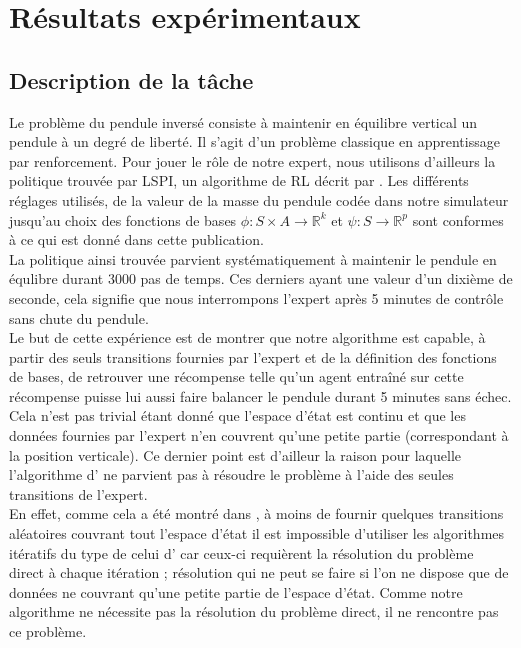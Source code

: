 \documentclass[publibook-draft]{CAp2012}
\begin{document}
\section{Résultats expérimentaux}
\label{exp.sec}
\subsection{Description de la tâche}
Le problème du pendule inversé consiste à maintenir en équilibre vertical un pendule à un degré de liberté. Il s'agit d'un problème classique en apprentissage par renforcement. Pour jouer le rôle de notre expert, nous utilisons d'ailleurs la politique trouvée par LSPI, un algorithme de RL décrit par \citet{lagoudakis2003least}. Les différents réglages utilisés, de la valeur de la masse du pendule codée dans notre simulateur jusqu'au choix des fonctions de bases $\phi : S\times A \rightarrow \mathbb{R}^k$ et $\psi : S \rightarrow \mathbb{R}^p$ sont conformes à ce qui est donné dans cette publication.\\

La politique ainsi trouvée parvient systématiquement à maintenir le pendule en équlibre durant 3000 pas de temps. Ces derniers ayant une valeur d'un dixième de seconde, cela signifie que nous interrompons l'expert après 5 minutes de contrôle sans chute du pendule.\\

Le but de cette expérience est de montrer que notre algorithme est capable, à partir des seuls transitions fournies par l'expert et de la définition des fonctions de bases, de retrouver une récompense telle qu'un agent entraîné sur cette récompense puisse lui aussi faire balancer le pendule durant 5 minutes sans échec. Cela n'est pas trivial étant donné que l'espace d'état est continu et que les données fournies par l'expert n'en couvrent qu'une petite partie (correspondant à la position verticale). Ce dernier point est d'ailleur la raison pour laquelle l'algorithme d'\citet{abbeel2004apprenticeship} ne parvient pas à résoudre le problème à l'aide des seules transitions de l'expert.\\

En effet, comme cela a été montré dans \citep{klein2011batch}, à moins de fournir quelques transitions aléatoires couvrant tout l'espace d'état il est impossible d'utiliser les algorithmes itératifs du type de celui d'\citet{abbeel2004apprenticeship} car ceux-ci requièrent la résolution du problème direct à chaque itération ; résolution qui ne peut se faire si l'on ne dispose que de données ne couvrant qu'une petite partie de l'espace d'état. Comme notre algorithme ne nécessite pas la résolution du problème direct, il ne rencontre pas ce problème.
\end{document}
